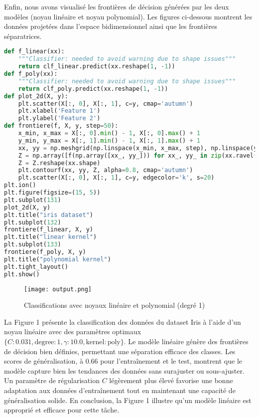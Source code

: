 \documentclass[12pt,a4paper]{report}
\begin{document}
Enfin, nous avons visualisé les frontières de décision générées par les deux modèles (noyau linéaire et noyau polynomial). Les figures ci-dessous montrent les données projetées dans l’espace bidimensionnel ainsi que les frontières séparatrices.

\begin{lstlisting}[language=Python, caption=Visualisation des résultats]
def f_linear(xx):
    """Classifier: needed to avoid warning due to shape issues"""
    return clf_linear.predict(xx.reshape(1, -1))
def f_poly(xx):
    """Classifier: needed to avoid warning due to shape issues"""
    return clf_poly.predict(xx.reshape(1, -1))
def plot_2d(X, y):
    plt.scatter(X[:, 0], X[:, 1], c=y, cmap='autumn')
    plt.xlabel('Feature 1')
    plt.ylabel('Feature 2')
def frontiere(f, X, y, step=50):
    x_min, x_max = X[:, 0].min() - 1, X[:, 0].max() + 1
    y_min, y_max = X[:, 1].min() - 1, X[:, 1].max() + 1
    xx, yy = np.meshgrid(np.linspace(x_min, x_max, step), np.linspace(y_min, y_max, step))
    Z = np.array([f(np.array([xx_, yy_])) for xx_, yy_ in zip(xx.ravel(), yy.ravel())])
    Z = Z.reshape(xx.shape)
    plt.contourf(xx, yy, Z, alpha=0.8, cmap='autumn')
    plt.scatter(X[:, 0], X[:, 1], c=y, edgecolor='k', s=20)
plt.ion()
plt.figure(figsize=(15, 5))
plt.subplot(131)
plot_2d(X, y)
plt.title("iris dataset")
plt.subplot(132)
frontiere(f_linear, X, y)
plt.title("linear kernel")
plt.subplot(133)
frontiere(f_poly, X, y)
plt.title("polynomial kernel")
plt.tight_layout()
plt.show()
\end{lstlisting}
\begin{figure}[H]
    \centering
    \begin{minipage}{0.9\textwidth}
        \centering
        \texttt{[image: output.png]}
        \caption{ Classifications avec noyaux linéaire et polynomial (degré 1) }
    \end{minipage}
    \end{figure}
 

La Figure 1 présente la classification des données du dataset Iris à l’aide d’un noyau linéaire avec des paramètres optimaux \(\{C : 0.031, \text{degree} : 1, \gamma : 10.0, \text{kernel} : \text{poly}\}\). Le modèle linéaire génère des frontières de décision bien définies, permettant une séparation efficace des classes. Les scores de généralisation, à \(0.66\) pour l’entraînement et le test, montrent que le modèle capture bien les tendances des données sans surajuster ou sous-ajuster. Un paramètre de régularisation \(C\) légèrement plus élevé favorise une bonne adaptation aux données d’entraînement tout en maintenant une capacité de généralisation solide. En conclusion, la Figure 1 illustre qu’un modèle linéaire est approprié et efficace pour cette tâche.
\end{document}
